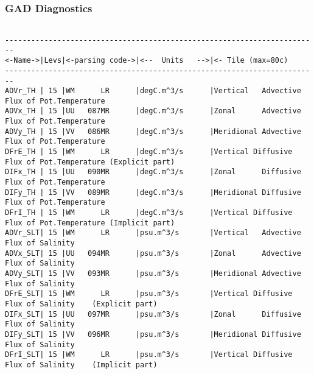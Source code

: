 \subsubsection{GAD Diagnostics}
\label{sec:pkg:gad:diagnostics}

{\footnotesize
\begin{verbatim}

------------------------------------------------------------------------
<-Name->|Levs|<-parsing code->|<--  Units   -->|<- Tile (max=80c) 
------------------------------------------------------------------------
ADVr_TH | 15 |WM      LR      |degC.m^3/s      |Vertical   Advective Flux of Pot.Temperature
ADVx_TH | 15 |UU   087MR      |degC.m^3/s      |Zonal      Advective Flux of Pot.Temperature
ADVy_TH | 15 |VV   086MR      |degC.m^3/s      |Meridional Advective Flux of Pot.Temperature
DFrE_TH | 15 |WM      LR      |degC.m^3/s      |Vertical Diffusive Flux of Pot.Temperature (Explicit part)
DIFx_TH | 15 |UU   090MR      |degC.m^3/s      |Zonal      Diffusive Flux of Pot.Temperature
DIFy_TH | 15 |VV   089MR      |degC.m^3/s      |Meridional Diffusive Flux of Pot.Temperature
DFrI_TH | 15 |WM      LR      |degC.m^3/s      |Vertical Diffusive Flux of Pot.Temperature (Implicit part)
ADVr_SLT| 15 |WM      LR      |psu.m^3/s       |Vertical   Advective Flux of Salinity
ADVx_SLT| 15 |UU   094MR      |psu.m^3/s       |Zonal      Advective Flux of Salinity
ADVy_SLT| 15 |VV   093MR      |psu.m^3/s       |Meridional Advective Flux of Salinity
DFrE_SLT| 15 |WM      LR      |psu.m^3/s       |Vertical Diffusive Flux of Salinity    (Explicit part)
DIFx_SLT| 15 |UU   097MR      |psu.m^3/s       |Zonal      Diffusive Flux of Salinity
DIFy_SLT| 15 |VV   096MR      |psu.m^3/s       |Meridional Diffusive Flux of Salinity
DFrI_SLT| 15 |WM      LR      |psu.m^3/s       |Vertical Diffusive Flux of Salinity    (Implicit part)
\end{verbatim}
}

